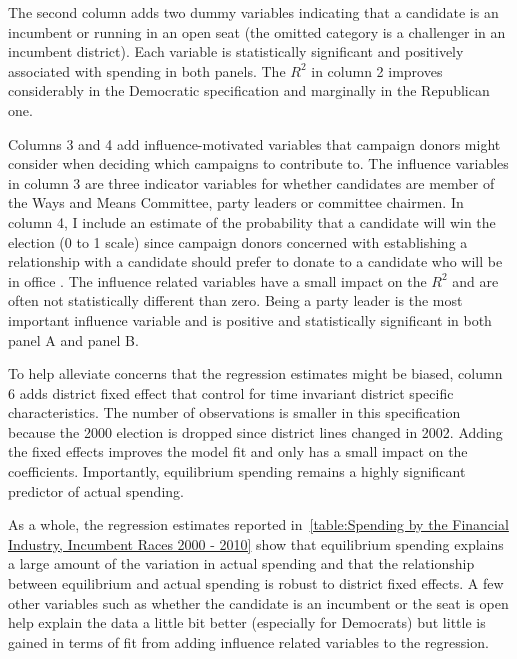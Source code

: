 \documentclass[12pt,final,fleqn]{article}
\theoremstyle{plain}
\begin{document}
The second column adds two dummy variables indicating that a candidate is an incumbent or running in an open seat (the omitted category is a challenger in an incumbent district). Each variable is statistically significant and positively associated with spending in both panels. The $R^2$ in column 2 improves considerably in the Democratic specification and marginally in the Republican one.

Columns 3 and 4 add influence-motivated variables that campaign donors might consider when deciding which campaigns to contribute to. The influence variables in column 3 are three indicator variables for whether candidates are member of the Ways and Means Committee, party leaders or committee chairmen. In column 4, I include an estimate of the probability that a candidate will win the election (0 to 1 scale) since campaign donors concerned with establishing a relationship with a candidate should prefer to donate to a candidate who will be in office \citep[see for instance][]{snyder1990campaign}. The influence related variables have a small impact on the $R^2$ and are often not statistically different than zero. Being a party leader is the most important influence variable and is positive and statistically significant in both panel A and panel B. 

To help alleviate concerns that the regression estimates might be biased, column 6 adds district fixed effect that control for time invariant district specific characteristics. The number of observations is smaller in this specification because the 2000 election is dropped since district lines changed in 2002. Adding the fixed effects improves the model fit and only has a small impact on the coefficients. Importantly, equilibrium spending remains a highly significant predictor of actual spending.

As a whole, the regression estimates reported in~\autoref{table:Spending by the Financial Industry, Incumbent Races 2000 - 2010} show that equilibrium spending explains a large amount of the variation in actual spending and that the relationship between equilibrium and actual spending is robust to district fixed effects. A few other variables such as whether the candidate is an incumbent or the seat is open help explain the data a little bit better (especially for Democrats) but little is gained in terms of fit from adding influence related variables to the regression.
\end{document}
